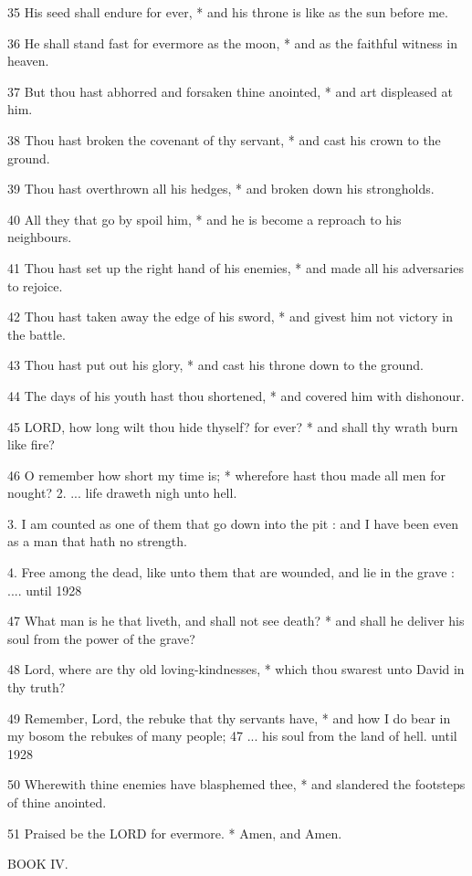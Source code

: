 35 His seed shall endure for ever, * and his throne
is like as the sun before me.

36 He shall stand fast for evermore as the moon, *
and as the faithful witness in heaven.

37 But thou hast abhorred and forsaken thine anointed,
* and art displeased at him.

38 Thou hast broken the covenant of thy servant, *
and cast his crown to the ground.

39 Thou hast overthrown all his hedges, * and broken
down his strongholds.

40 All they that go by spoil him, * and he is become
a reproach to his neighbours.

41 Thou hast set up the right hand of his enemies,
* and made all his adversaries to rejoice.

42 Thou hast taken away the edge of his sword, * and
givest him not victory in the battle.

43 Thou hast put out his glory, * and cast his throne
down to the ground.

44 The days of his youth hast thou shortened, * and
covered him with dishonour.

45 LORD, how long wilt thou hide thyself? for ever?
* and shall thy wrath burn like fire?

46 O remember how short my time is; * wherefore hast
thou made all men for nought? 2. ... life draweth nigh unto
hell.

3. I am counted as one of them that go down into the
pit : and I have been even as a man that hath no strength.

4. Free among the dead, like unto them that are wounded, and lie in the
grave : ....
until 1928

47 What man is he that liveth, and shall not see death? * and shall he deliver
his soul from the power of the grave?

48 Lord, where are thy old loving-kindnesses, * which
thou swarest unto David in thy truth?

49 Remember, Lord, the rebuke that thy servants have,
* and how I do bear in my bosom the rebukes of many people; 47 ... his soul from the land
of hell.
until 1928

50 Wherewith thine enemies have blasphemed thee, * and slandered the footsteps
of thine anointed.

51
Praised be the LORD for evermore. * Amen, and Amen.

BOOK
IV.

